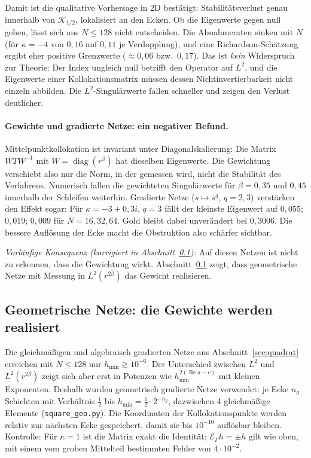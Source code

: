 \documentclass[11pt, a4paper]{article}
\newcommand{\EG}{\mathcal{E}_\Gamma}
\theoremstyle{plain}
\theoremstyle{definition}
\begin{document}
Damit ist die qualitative Vorhersage in 2D bestätigt: Stabilitätsverlust genau
innerhalb von $\mathcal{K}_{1/2}$, lokalisiert an den Ecken. Ob die Eigenwerte gegen
null gehen, lässt sich aus $N\le128$ nicht entscheiden. Die Abnahmeraten sinken
mit $N$ (für $\kappa=-4$ von $0{,}16$ auf $0{,}11$ je Verdopplung), und eine
Richardson-Schätzung ergibt eher positive Grenzwerte ($\approx0{,}06$ bzw.\ $0{,}17$).
Das ist \emph{kein} Widerspruch zur Theorie: Der Index ungleich null betrifft den
Operator auf $L^2$, und die Eigenwerte einer Kollokationsmatrix müssen dessen
Nichtinvertierbarkeit nicht einzeln abbilden. Die $L^2$-Singulärwerte fallen
schneller und zeigen den Verlust deutlicher.

\paragraph{Gewichte und gradierte Netze: ein negativer Befund.}
Mittelpunktkollokation ist invariant unter Diagonalskalierung: Die Matrix
$WTW^{-1}$ mit $W=\operatorname{diag}(r^\beta)$ hat dieselben Eigenwerte. Die
Gewichtung verschiebt also nur die Norm, in der gemessen wird, nicht die Stabilität
des Verfahrens. Numerisch fallen die gewichteten Singulärwerte für $\beta=0{,}35$
und $0{,}45$ innerhalb der Schleifen weiterhin. Gradierte Netze
($s\mapsto s^q$, $q=2,3$) verstärken den Effekt sogar: Für $\kappa=-3+0{,}3i$,
$q=3$ fällt der kleinste Eigenwert auf $0{,}055$; $0{,}019$; $0{,}009$ für $N=16,32,64$.
Gold bleibt dabei unverändert bei $0{,}3006$. Die bessere Auflösung der Ecke macht
die Obstruktion also schärfer sichtbar.

\emph{Vorläufige Konsequenz (korrigiert in Abschnitt~\ref{sec:geo}):} Auf diesen
Netzen ist nicht zu erkennen, dass die Gewichtung wirkt. Abschnitt~\ref{sec:geo} zeigt, dass
geometrische Netze mit Messung in $L^2(r^{2\beta})$ das Gewicht realisieren.

\subsection{Geometrische Netze: die Gewichte werden realisiert}\label{sec:geo}

Die gleichmäßigen und algebraisch gradierten Netze aus Abschnitt~\ref{sec:quadrat}
erreichen mit $N\le128$ nur $h_{\min}\gtrsim10^{-6}$. Der Unterschied zwischen
$L^2$ und $L^2(r^{2\beta})$ zeigt sich aber erst in Potenzen wie
$h_{\min}^{2(\operatorname{Re}a-c)}$ mit kleinen Exponenten. Deshalb wurden
geometrisch gradierte Netze verwendet: je Ecke $n_g$ Schichten mit
Verhältnis $\tfrac12$ bis $h_{\min}=\tfrac12\cdot2^{-n_g}$, dazwischen 4 gleichmäßige
Elemente (\texttt{square\_geo.py}). Die Koordinaten der Kollokationspunkte werden
relativ zur nächsten Ecke gespeichert, damit sie bis $10^{-10}$ auflösbar bleiben.
Kontrolle: Für $\kappa=1$ ist die Matrix exakt die Identität; $\EG h=\pm h$ gilt wie
oben, mit einem vom groben Mittelteil bestimmten Fehler von $4\cdot10^{-2}$.
\end{document}

